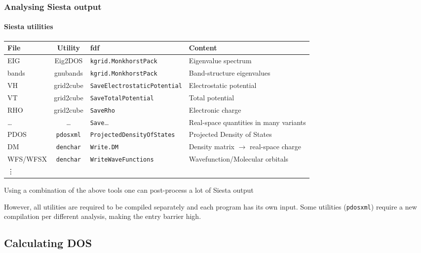 \begin{frame}
  \frametitle{Analysing Siesta output}
  \framesubtitle{Siesta utilities}

  \footnotesize
  \begin{tabular}{lcll}
    File & Utility & fdf & Content
    \\
    \hline
    EIG & Eig2DOS & \texttt{kgrid.MonkhorstPack} & Eigenvalue spectrum
    \\
    bands & gnubands & \texttt{kgrid.MonkhorstPack} & Band-structure eigenvalues
    \\
    VH & grid2cube & \texttt{SaveElectrostaticPotential} & Electrostatic potential
    \\
    VT & grid2cube & \texttt{SaveTotalPotential} & Total potential
    \\
    RHO & grid2cube & \texttt{SaveRho} & Electronic charge
    \\
    \dots & \dots & \texttt{Save}\dots & Real-space quantities in many variants
    \\
    PDOS & \texttt{pdosxml} & \texttt{ProjectedDensityOfStates} & Projected Density of States
    \\
    DM & \texttt{denchar} & \texttt{Write.DM} & Density matrix $\to$ real-space charge
    \\
    WFS/WFSX & \texttt{denchar} & \texttt{WriteWaveFunctions} & Wavefunction/Molecular
    orbitals
    \\
    \vdots
  \end{tabular}

  Using a combination of the above tools one can post-process a lot of Siesta output

  However, all utilities are required to be compiled separately and each program has its
  own input. Some utilities (\texttt{pdosxml}) require a new compilation per different
  analysis, making the entry barrier high.

\end{frame}


\subsection{Calculating DOS}

